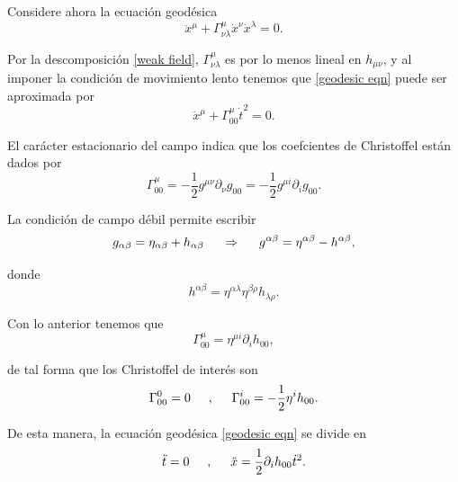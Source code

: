 \documentclass{article}
\numberwithin{equation}{section}
\theoremstyle{definition}
\begin{document}
Considere ahora la ecuación geodésica 
\begin{equation}
\label{geodesic eqn}
\ddot{x}^\mu + \Gamma^{\mu}_{\nu \lambda}\dot{x}^\nu\dot{x}^\lambda = 0.
\end{equation}

Por la descomposición \eqref{weak field}, $\Gamma^{\mu}_{\nu \lambda}$ es por lo menos lineal en $h_{\mu \nu}$, y al imponer la condición de movimiento lento tenemos que \eqref{geodesic eqn} puede ser aproximada por
\begin{equation*}
\ddot{x}^\mu + \Gamma^{\mu}_{00}\dot{t}^2 = 0.
\end{equation*}

El carácter estacionario del campo indica que los coefcientes de Christoffel están dados por 
\begin{equation*}
\Gamma^{\mu}_{00} = -\frac{1}{2}g^{\mu \nu}\partial_\nu g_{00} = -\frac{1}{2}g^{\mu i}\partial_i g_{00}.
\end{equation*}

La condición de campo débil permite escribir
\begin{equation*}
g_{\alpha \beta} = \eta_{\alpha \beta} + h_{\alpha \beta} \hspace{.5cm} \Rightarrow \hspace{.5cm} g^{\alpha \beta} = \eta^{\alpha \beta} - h^{\alpha \beta},
\end{equation*}

donde 
\begin{equation*}
h^{\alpha \beta} = \eta^{\alpha \lambda}\eta^{\beta \rho}h_{\lambda \rho}.
\end{equation*}

Con lo anterior tenemos que 
\begin{equation*}
\Gamma^{\mu}_{00} = \eta^{\mu i}\partial_ih_{00},
\end{equation*}

de tal forma que los Christoffel de interés son
\begin{equation*}
\Gamma^{0}_{00} = 0 \hspace{.5cm},\hspace{.5cm} \Gamma^{i}_{00} = -\frac{1}{2}\eta^ih_{00}.
\end{equation*}

De esta manera, la ecuación geodésica \eqref{geodesic eqn} se divide en
\begin{equation*}
\ddot{t} = 0 \hspace{.5cm},\hspace{.5cm} \ddot{x} = \frac{1}{2}\partial_ih_{00}\dot{t}^2.
\end{equation*}
\end{document}
